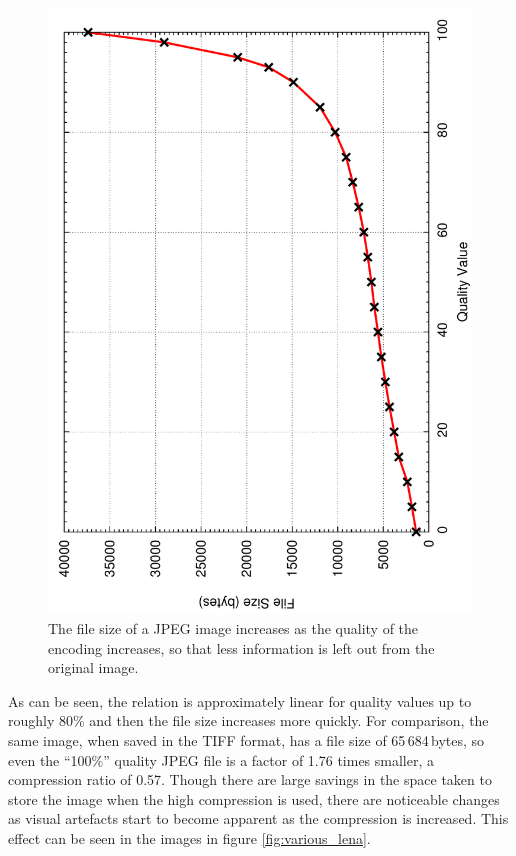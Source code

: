 \begin{figure}[ht]
\begin{minipage}[c]{0.65\linewidth}
				\includegraphics[angle=270,width=\textwidth]{qualityvsfilesize.pdf}
			\end{minipage}
			\caption{The file size of a JPEG image increases as the quality of the encoding increases, so that less information is left out from the original image.\label{fig:percent_vs_size}}
		\end{figure}

		As can be seen, the relation is approximately linear for quality values up to roughly 80\% and then the file size increases more quickly. For comparison, the same image, when saved in the TIFF format, has a file size of 65\,684\,bytes, so even the ``100\%'' quality JPEG file is a factor of 1.76 times smaller, a compression ratio of 0.57. Though there are large savings in the space taken to store the image when the high compression is used, there are noticeable changes as visual artefacts start to become apparent as the compression is increased. This effect can be seen in the images in figure \ref{fig:various_lena}.


